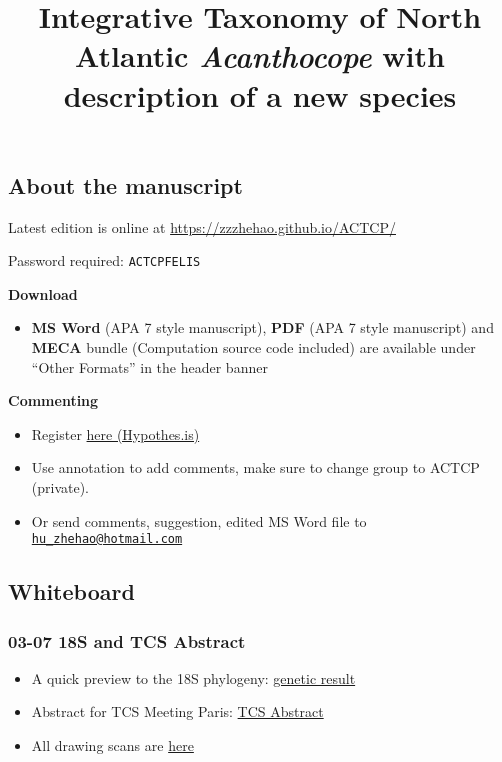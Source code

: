 \documentclass[
  man,
  longtable,
  nolmodern,
  notxfonts,
  notimes,
  colorlinks=true,linkcolor=blue,citecolor=blue,urlcolor=blue]{apa7}
\title{Integrative Taxonomy of North Atlantic \emph{Acanthocope} with
description of a new species}
\providecommand{\tightlist}{%
  \setlength{\itemsep}{0pt}\setlength{\parskip}{0pt}}
\begin{document}
\maketitle


\setcounter{secnumdepth}{-\maxdimen} %

\setlength\LTleft{0pt}


\subsection{About the manuscript}\label{about-the-manuscript}

Latest edition is online at
\href{https://zzzhehao.github.io/ACTCP/\#ACTCPFELIS}{https://zzzhehao.github.io/ACTCP/}

Password required: \texttt{ACTCPFELIS}

\textbf{Download}

\begin{itemize}
\tightlist
\item
  \textbf{MS Word} (APA 7 style manuscript), \textbf{PDF} (APA 7 style
  manuscript) and \textbf{MECA} bundle (Computation source code
  included) are available under ``Other Formats'' in the header banner
\end{itemize}

\textbf{Commenting}

\begin{itemize}
\tightlist
\item
  Register \href{https://hypothes.is/groups/6KpDgDmQ/actcp}{here
  (Hypothes.is)}
\item
  Use annotation to add comments, make sure to change group to ACTCP
  (private).
\item
  Or send comments, suggestion, edited MS Word file to
  \href{mailto:hu_zhehao@hotmail.com}{\nolinkurl{hu\_zhehao@hotmail.com}}
\end{itemize}

\subsection{Whiteboard}\label{whiteboard}

\subsubsection{03-07 \textbar{} 18S and TCS
Abstract}\label{s-and-tcs-abstract}

\begin{itemize}
\tightlist
\item
  A quick preview to the 18S phylogeny:
  \href{./notebooks/42\%20Result\%20-\%20Genetics.qmd}{genetic result}
\item
  Abstract for TCS Meeting Paris:
  \href{./notebooks/11\%20TCS-Abstract.qmd}{TCS Abstract}
\item
  All drawing scans are \href{./notebooks/51\%20Drawing.qmd}{here}
\end{itemize}
\end{document}

